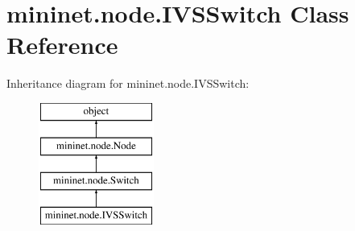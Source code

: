 \hypertarget{classmininet_1_1node_1_1IVSSwitch}{\section{mininet.\-node.\-I\-V\-S\-Switch Class Reference}
\label{classmininet_1_1node_1_1IVSSwitch}
}
Inheritance diagram for mininet.\-node.\-I\-V\-S\-Switch\-:\begin{figure}[H]
\begin{center}
\leavevmode
\includegraphics[height=4.000000cm]{classmininet_1_1node_1_1IVSSwitch}
\end{center}
\end{figure}
